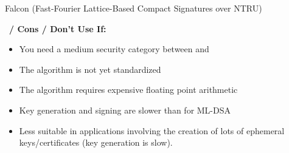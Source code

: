 \begin{algorithmbox}{Falcon (Fast-Fourier Lattice-Based Compact Signatures over NTRU)}
\begin{minipage}[t]{0.49\textwidth}
\begin{itemize}[leftmargin=*]
        \end{itemize}
    \end{minipage}
    \hfill
    \begin{minipage}[t]{0.49\textwidth}
        \scriptsize \faThumbsDown\, {\bfseries / Cons / Don't Use If:}
        \begin{itemize}[leftmargin=*]
        \setlength\itemsep{0em}
        \item You need a medium security category between  \hspace{-4mm} and 
        \item The algorithm is not yet standardized
        \item The algorithm requires expensive floating point arithmetic
        \item Key generation and signing are slower than for ML-DSA
        \item Less suitable in applications involving the creation of lots of ephemeral keys/certificates (key generation is slow).
        \end{itemize}
    \end{minipage}
\end{algorithmbox}
